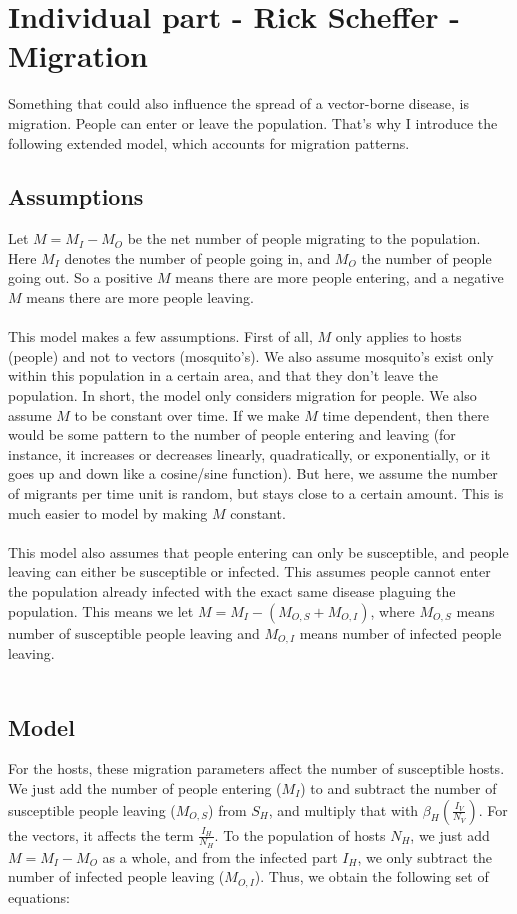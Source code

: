 
\section{Individual part - Rick Scheffer - Migration}
Something that could also influence the spread of a vector-borne disease, is migration. People can enter or leave the population. That's why I introduce the following extended model, which accounts for migration patterns.

\subsection{Assumptions}
Let $M = M_I - M_O$ be the net number of people migrating to the population. Here $M_I$ denotes the number of people going in, and $M_O$ the number of people going out. So a positive $M$ means there are more people entering, and a negative $M$ means there are more people leaving. \\\\

\noindent This model makes a few assumptions. First of all, $M$ only applies to hosts (people) and not to vectors (mosquito's). We also assume mosquito's exist only within this population in a certain area, and that they don't leave the population. In short, the model only considers migration for people. We also assume $M$ to be constant over time. If we make $M$ time dependent, then there would be some pattern to the number of people entering and leaving (for instance, it increases or decreases linearly, quadratically, or exponentially, or it goes up and down like a cosine/sine function). But here, we assume the number of migrants per time unit is random, but stays close to a certain amount. This is much easier to model by making $M$ constant.  \\\\

\noindent This model also assumes that people entering can only be susceptible, and people leaving can either be susceptible or infected. This assumes people cannot enter the population already infected with the exact same disease plaguing the population. This means we let $M = M_I - (M_{O,S} + M_{O,I})$, where $M_{O,S}$ means number of susceptible people leaving and $M_{O,I}$ means number of infected people leaving. \\\\

\subsection{Model}
\noindent For the hosts, these migration parameters affect the number of susceptible hosts. We just add the number of people entering ($M_I$) to and subtract the number of susceptible people leaving ($M_{O,S}$) from $S_H$, and multiply that with $\beta_H(\frac{I_V}{N_V})$. For the vectors, it affects the term $\frac{I_H}{N_H}$. To the population of hosts $N_H$, we just add $M = M_I - M_O$ as a whole, and from the infected part $I_H$, we only subtract the number of infected people leaving ($M_{O,I}$). Thus, we obtain the following set of equations:

